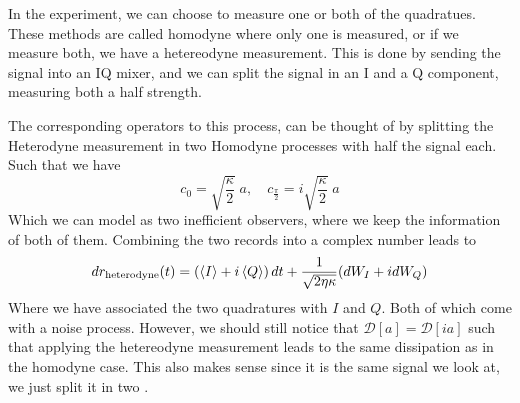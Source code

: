 In the experiment, we can choose to measure one or both of the quadratues. These methods are called homodyne where only one is measured, or if we measure both,  we have a hetereodyne measurement. This is done by sending the signal into an IQ mixer, and we can split the signal in an I and a Q component, measuring both a half strength. 

The corresponding operators to this process, can be thought of by splitting the Heterodyne measurement in two Homodyne processes with half the signal each. Such that we have
\begin{equation}
    c_0 = \sqrt{\frac{\kappa}{2}}\; a, \quad c_{\frac{\pi}{2}} = i \sqrt{\frac{\kappa}{2}} \; a
\end{equation}
Which we can model as two inefficient observers, where we keep the information of both of them. Combining the two records into a complex number leads to
\begin{equation}
    dr_{\text{heterodyne}}(t) = \left(\expval{I} + i\expval{Q}\right)dt  + \frac{1}{\sqrt{2\eta\kappa}}(dW_I + i dW_Q)
\end{equation}
Where we have associated the two quadratures with $I$ and $Q$. Both of which come with a noise process. However, we should still notice that $\mathcal{D}[a] = \mathcal{D}[ia]$ such that applying the hetereodyne measurement leads to the same dissipation as in the homodyne case. This also makes sense since it is the same signal we look at, we just split it in two \cite{campagne-ibarcq_measurement_nodate}. 



